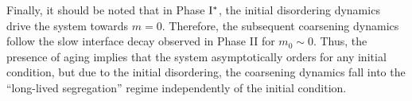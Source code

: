 	Finally, it should be noted that in Phase ${\rm I}^{*}$, the initial disordering dynamics drive the system towards $m=0$. Therefore, the subsequent coarsening dynamics follow the slow interface decay observed in Phase II for $m_0 \sim 0$. Thus, the presence of aging implies that the system asymptotically orders for any initial condition, but due to the initial disordering, the coarsening dynamics fall into the ``long-lived segregation'' regime independently of the initial condition. 
	
	
